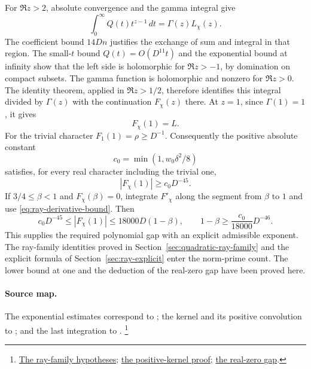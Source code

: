 For \(\Re z>2\), absolute convergence and the gamma integral give
\[
       \int_0^\infty Q(t)t^{z-1}\,dt
                   =\Gamma(z)L_\chi(z).
\]
The coefficient bound \(14Dn\) justifies the exchange of sum and
integral in that region. The small-\(t\) bound \(Q(t)=O(D^{11}t)\)
and the exponential bound at infinity show that the left side is
holomorphic for \(\Re z>-1\), by domination on compact subsets.
The gamma function is holomorphic and nonzero for \(\Re z>0\).
The identity theorem, applied in \(\Re z>1/2\), therefore identifies
this integral divided by \(\Gamma(z)\) with the continuation
\(F_\chi(z)\) there. At \(z=1\), since \(\Gamma(1)=1\), it gives
\[
                           F_\chi(1)=L.
\]
For the trivial character \(F_1(1)=\rho\geq D^{-1}\).
Consequently the positive absolute constant
\[
                  c_0=\min(1,w_0\delta^2/8)
\]
satisfies, for every real character including the trivial one,
\begin{equation}
 \label{eq:ray-real-value}
                         |F_\chi(1)|\geq c_0D^{-45}.
\end{equation}
If \(3/4\leq\beta<1\) and \(F_\chi(\beta)=0\), integrate
\(F'_\chi\) along the segment from \(\beta\) to \(1\) and use
\eqref{eq:ray-derivative-bound}. Then
\[
       c_0D^{-45}\leq|F_\chi(1)|
                         \leq18000D(1-\beta),
 \qquad
             1-\beta\geq\frac{c_0}{18000}D^{-46}.
\]
This supplies the required polynomial gap with an explicit
admissible exponent. The ray-family identities proved in Section~\ref{sec:quadratic-ray-family}
and the explicit formula of Section~\ref{sec:ray-explicit} enter the
norm-prime count. The lower bound at one and the
deduction of the real-zero gap have been proved here.

\paragraph{Source map.}
The exponential estimates correspond to
; the kernel and its positive convolution to
; and the last integration
to .
\footnote{\href{https://github.com/Deicyde/riemann-hypothesis/blob/40e56bab026552e089d7afcfeff08d2defb9c005/src/Development/AbelianVarietyTheory/Definitions/GlobalTwisting/LamIdealOfNotPrimePow.lean}{The ray-family hypotheses};
\href{https://github.com/Deicyde/riemann-hypothesis/blob/40e56bab026552e089d7afcfeff08d2defb9c005/src/Development/AbelianVarietyTheory/Proofs/GlobalInterpolation/NormRayClassFamilyFOneGeOfRealCharacter.lean}{the positive-kernel proof};
\href{https://github.com/Deicyde/riemann-hypothesis/blob/40e56bab026552e089d7afcfeff08d2defb9c005/src/Development/AbelianVarietyTheory/Proofs/GlobalInterpolation/ExistsRayClassLFunctionRealZeroFarFromOne.lean}{the real-zero gap}.}
